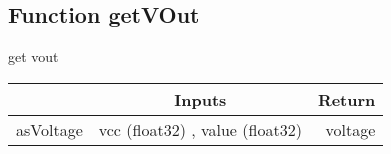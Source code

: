 \documentclass[a4paper,12pt,oneside,pdflatex,italian,final,twocolumn]{article}
\begin{document}
\raggedright
\subsection{Function getVOut }
get vout \\

\centering
\begin{tabular}{lcr}
\toprule
  & Inputs & Return \\
\midrule
asVoltage &
vcc (float32)
, 
value (float32)

&
voltage
\\
\bottomrule
\end{tabular}



\raggedright
\end{document}
